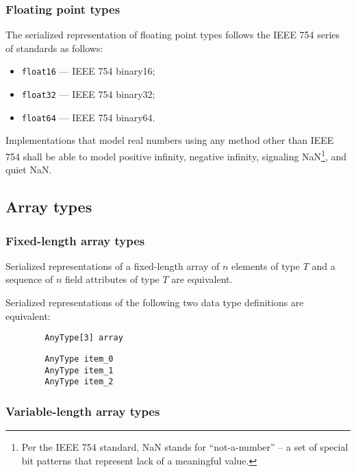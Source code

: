 \subsubsection{Floating point types}

The serialized representation of floating point types follows the IEEE 754 series of standards as follows:

\begin{itemize}
    \item \verb|float16| --- IEEE 754 binary16;
    \item \verb|float32| --- IEEE 754 binary32;
    \item \verb|float64| --- IEEE 754 binary64.
\end{itemize}

Implementations that model real numbers using any method other than IEEE 754 shall be able to model
positive infinity, negative infinity, signaling NaN\footnote{%
    Per the IEEE 754 standard, NaN stands for
    ``not-a-number'' -- a set of special bit patterns that represent lack of a meaningful value.
}, and quiet NaN.

\subsection{Array types}

\subsubsection{Fixed-length array types}

Serialized representations of a fixed-length array of $n$ elements of type $T$ and
a sequence of $n$ field attributes of type $T$ are equivalent.

\begin{remark}
    Serialized representations of the following two data type definitions are equivalent:

    \begin{verbatim}
        AnyType[3] array
    \end{verbatim}

    \begin{verbatim}
        AnyType item_0
        AnyType item_1
        AnyType item_2
    \end{verbatim}
\end{remark}

\subsubsection{Variable-length array types}\label{sec:dsdl_serialized_variable_length_array}

